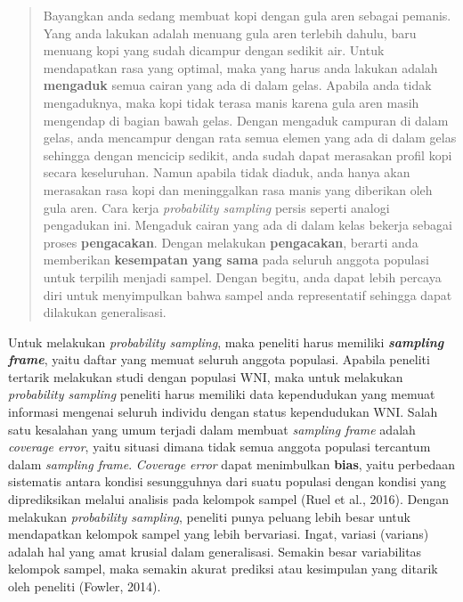 \documentclass[
  english,
  man]{apa6}
\begin{document}
\begin{quote}
Bayangkan anda sedang membuat kopi dengan gula aren sebagai pemanis. Yang anda lakukan adalah menuang gula aren terlebih dahulu, baru menuang kopi yang sudah dicampur dengan sedikit air. Untuk mendapatkan rasa yang optimal, maka yang harus anda lakukan adalah \textbf{mengaduk} semua cairan yang ada di dalam gelas. Apabila anda tidak mengaduknya, maka kopi tidak terasa manis karena gula aren masih mengendap di bagian bawah gelas. Dengan mengaduk campuran di dalam gelas, anda mencampur dengan rata semua elemen yang ada di dalam gelas sehingga dengan mencicip sedikit, anda sudah dapat merasakan profil kopi secara keseluruhan. Namun apabila tidak diaduk, anda hanya akan merasakan rasa kopi dan meninggalkan rasa manis yang diberikan oleh gula aren. Cara kerja \emph{probability sampling} persis seperti analogi pengadukan ini. Mengaduk cairan yang ada di dalam kelas bekerja sebagai proses \textbf{pengacakan}. Dengan melakukan \textbf{pengacakan}, berarti anda memberikan \textbf{kesempatan yang sama} pada seluruh anggota populasi untuk terpilih menjadi sampel. Dengan begitu, anda dapat lebih percaya diri untuk menyimpulkan bahwa sampel anda representatif sehingga dapat dilakukan generalisasi.
\end{quote}

Untuk melakukan \emph{probability sampling}, maka peneliti harus memiliki \textbf{\emph{sampling frame}}, yaitu daftar yang memuat seluruh anggota populasi. Apabila peneliti tertarik melakukan studi dengan populasi WNI, maka untuk melakukan \emph{probability sampling} peneliti harus memiliki data kependudukan yang memuat informasi mengenai seluruh individu dengan status kependudukan WNI. Salah satu kesalahan yang umum terjadi dalam membuat \emph{sampling frame} adalah \emph{coverage error}, yaitu situasi dimana tidak semua anggota populasi tercantum dalam \emph{sampling frame}. \emph{Coverage error} dapat menimbulkan \textbf{bias}, yaitu perbedaan sistematis antara kondisi sesungguhnya dari suatu populasi dengan kondisi yang diprediksikan melalui analisis pada kelompok sampel (Ruel et al., 2016). Dengan melakukan \emph{probability sampling}, peneliti punya peluang lebih besar untuk mendapatkan kelompok sampel yang lebih bervariasi. Ingat, variasi (varians) adalah hal yang amat krusial dalam generalisasi. Semakin besar variabilitas kelompok sampel, maka semakin akurat prediksi atau kesimpulan yang ditarik oleh peneliti (Fowler, 2014).
\end{document}
